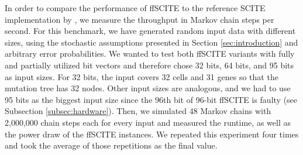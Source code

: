 In order to compare the performance of \ac{ffSCITE} to the reference \ac{SCITE} implementation by \citeauthor{tree2016} \cite{tree2016}, we measure the throughput in Markov chain steps per second.
For this benchmark, we have generated random input data with different sizes, using the stochastic assumptions presented in Section \ref{sec:introduction} and arbitrary error probabilities. We wanted to test both \ac{ffSCITE} variants with fully and partially utilized bit vectors and therefore chose 32 bits, 64 bits, and 95 bits as input sizes. For 32 bits, the input covers 32 cells and 31 genes so that the mutation tree has 32 nodes. Other input sizes are analogous, and we had to use 95 bits as the biggest input size since the 96th bit of 96-bit \ac{ffSCITE} is faulty (see Subsection \ref{subsec:hardware}). Then, we simulated 48 Markov chains with 2,000,000 chain steps each for every input and measured the runtime, as well as the power draw of the \ac{ffSCITE} instances. We repeated this experiment four times and took the average of those repetitions as the final value.

